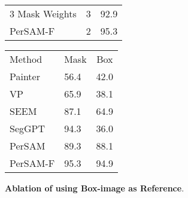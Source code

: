\documentclass{article} \usepackage{iclr2024_conference,times}
\makeatletter
\newcommand\tabcaption{\def\@captype{table}\caption}
\makeatother
\begin{document}
\begin{figure*}
\begin{minipage}[t!]{0.325\linewidth}
\begin{adjustbox}{width=\linewidth}
\begin{tabular}{llc}
      3 Mask Weights &3 &92.9\\
      \cmidrule(lr){1-3}
      PerSAM-F &2 &95.3 \\
	  \bottomrule
	\end{tabular}
\end{adjustbox}
\end{minipage}
\hspace{0.2cm}
\begin{minipage}[t!]{0.275\linewidth}
\centering
 \small
\tabcaption{\textbf{Ablation of using Box-image as Reference}.}
\label{t6}
\begin{adjustbox}{width=\linewidth}
\centering
	\begin{tabular}{llc}
	\toprule
      Method &Mask &Box \\
		\cmidrule(lr){1-1} \cmidrule(lr){2-2} \cmidrule(lr){3-3} 
      Painter &56.4	&42.0  \\
      VP &65.9	&38.1  \\
      SEEM &87.1	&64.9  \\
      SegGPT  &94.3	&36.0\\
      \cmidrule(lr){1-3}
      PerSAM &89.3	&88.1 \\
      PerSAM-F &95.3	&94.9\\
	  \bottomrule
	\end{tabular}
\end{adjustbox}
\end{minipage}
\end{figure*}









\clearpage


\end{document}
